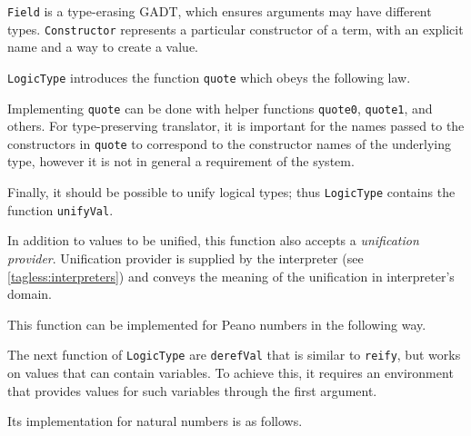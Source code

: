 
\lstinline{Field} is a type-erasing GADT, which ensures arguments may have different types. 
\lstinline{Constructor} represents a particular constructor of a term, with an explicit name and a way to create a value.

\lstinline{LogicType} introduces the function \lstinline{quote} which obeys the following law. 

Implementing \lstinline{quote} can be done with helper functions \lstinline{quote0}, \lstinline{quote1}, and others. 
For type-preserving translator, it is important for the names passed to the constructors in \lstinline{quote} to correspond to the constructor names of the underlying type, however it is not in general a requirement of the system.

Finally, it should be possible to unify logical types; thus \lstinline{LogicType} contains the function \lstinline{unifyVal}. 

In addition to values to be unified, this function also accepts a \emph{unification provider}.
Unification provider is supplied by the interpreter (see \ref{tagless:interpreters}) and conveys the meaning of the unification in  interpreter's domain.


This function can be implemented for Peano numbers in the following way. 


The next function of \lstinline{LogicType} are \lstinline{derefVal} that is similar to \lstinline{reify}, but works on values that can contain variables.
To achieve this, it requires an environment that provides values for such variables through the first argument. 


Its implementation for natural numbers is as follows. 

